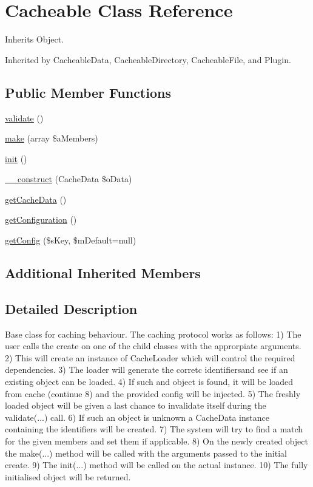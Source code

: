 \hypertarget{class_cacheable}{\section{Cacheable Class Reference}
\label{class_cacheable}
}


Inherits Object.



Inherited by Cacheable\-Data, Cacheable\-Directory, Cacheable\-File, and Plugin.

\subsection*{Public Member Functions}
\begin{DoxyCompactItemize}
\item 
\hyperlink{class_cacheable_ab70b135c0d4c3c3db6be09057ec7e361}{validate} ()
\item 
\hyperlink{class_cacheable_a1443eacff201d0317e4481cda75eb44b}{make} (array \$a\-Members)
\item 
\hyperlink{class_cacheable_a3bda7dd0df982212ce5817b5a30f2284}{init} ()
\item 
\hyperlink{class_cacheable_a16d53ddf3c4ac7217c32df7f0d763454}{\-\_\-\-\_\-construct} (Cache\-Data \$o\-Data)
\item 
\hyperlink{class_cacheable_a3825ea17270319f96d27540ae347fcde}{get\-Cache\-Data} ()
\item 
\hyperlink{class_cacheable_a1a737bc8da70a953cc9d21a7654aab6d}{get\-Configuration} ()
\item 
\hyperlink{class_cacheable_a525b1b070b6f528c6bbe1df12194fab1}{get\-Config} (\$s\-Key, \$m\-Default=null)
\end{DoxyCompactItemize}
\subsection*{Additional Inherited Members}


\subsection{Detailed Description}
Base class for caching behaviour. The caching protocol works as follows\-: 1) The user calls the create on one of the child classes with the approrpiate arguments. 2) This will create an instance of Cache\-Loader which will control the required dependencies. 3) The loader will generate the corretc identifiersand see if an existing object can be loaded. 4) If such and object is found, it will be loaded from cache (continue 8) and the provided config will be injected. 5) The freshly loaded object will be given a last chance to invalidate itself during the validate(...) call. 6) If such an object is unknown a Cache\-Data instance containing the identifiers will be created. 7) The system will try to find a match for the given members and set them if applicable. 8) On the newly created object the make(...) method will be called with the arguments passed to the initial create. 9) The init(...) method will be called on the actual instance. 10) The fully initialised object will be returned.


